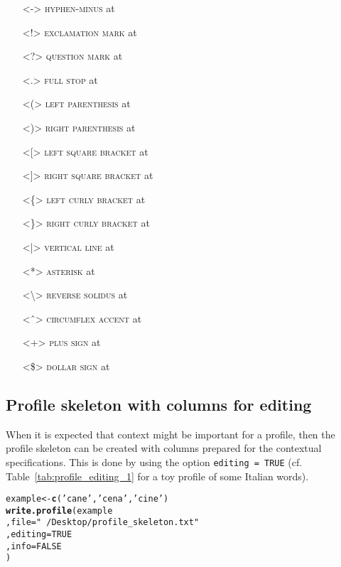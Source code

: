 \documentclass[output=inprep,
		biblatex
		]{LSP/langsci}\usepackage[]{graphicx}\usepackage[]{color}
\makeatletter
\newcommand{\hlnum}[1]{\textcolor[rgb]{0.686,0.059,0.569}{#1}}%
\newcommand{\hlstr}[1]{\textcolor[rgb]{0.192,0.494,0.8}{#1}}%
\newcommand{\hlstd}[1]{\textcolor[rgb]{0.345,0.345,0.345}{#1}}%
\newcommand{\hlkwb}[1]{\textcolor[rgb]{0.69,0.353,0.396}{#1}}%
\newcommand{\hlkwc}[1]{\textcolor[rgb]{0.333,0.667,0.333}{#1}}%
\newcommand{\hlkwd}[1]{\textcolor[rgb]{0.737,0.353,0.396}{\textbf{#1}}}%
\newenvironment{kframe}{%
 \def\at@end@of@kframe{}%
 \ifinner\ifhmode%
  \def\at@end@of@kframe{\end{minipage}}%
  \begin{minipage}{\columnwidth}%
 \fi\fi%
 \def\FrameCommand##1{\hskip\@totalleftmargin \hskip-\fboxsep
 \colorbox{shadecolor}{##1}\hskip-\fboxsep
     \hskip-\linewidth \hskip-\@totalleftmargin \hskip\columnwidth}%
 \MakeFramed {\advance\hsize-\width
   \@totalleftmargin\z@ \linewidth\hsize
   \@setminipage}}%
 {\par\unskip\endMakeFramed%
 \at@end@of@kframe}
\newenvironment{knitrout}{}{} %
\makeatother
\begin{document}
\begin{itemize}
  
  \item[] <-> \textsc{hyphen-minus} at 
  \item[] <!> \textsc{exclamation mark} at 
  \item[] <?> \textsc{question mark} at 
  \item[] <.> \textsc{full stop} at 
  \item[] <(> \textsc{left parenthesis} at 
  \item[] <)> \textsc{right parenthesis} at 
  \item[] <[> \textsc{left square bracket} at 
  \item[] <]> \textsc{right square bracket} at 
  \item[] <\{> \textsc{left curly bracket} at 
  \item[] <\}> \textsc{right curly bracket} at 
  \item[] <|> \textsc{vertical line} at 
  \item[] <*> \textsc{asterisk} at 
  \item[] <\backslash> \textsc{reverse solidus} at 
  \item[] <ˆ> \textsc{circumflex accent} at 
  \item[] <+> \textsc{plus sign} at 
  \item[] <\$> \textsc{dollar sign} at 
  
\end{itemize}

\subsection*{Profile skeleton with columns for editing}
\label{profile-editing}

When it is expected that context might be important for a profile, then the
profile skeleton can be created with columns prepared for the contextual
specifications. This is done by using the option \texttt{editing = TRUE} (cf.
Table~\ref{tab:profile_editing_1} for a toy profile of some Italian words).

\begin{knitrout}\footnotesize
{}\color{fgcolor}\begin{kframe}
\begin{alltt}
\hlstd{example} \hlkwb{<-} \hlkwd{c}\hlstd{(}\hlstr{'cane'}\hlstd{,} \hlstr{'cena'}\hlstd{,} \hlstr{'cine'}\hlstd{)}
\hlkwd{write.profile}\hlstd{(example}
              \hlstd{,} \hlkwc{file} \hlstd{=} \hlstr{"~/Desktop/profile_skeleton.txt"}
              \hlstd{,} \hlkwc{editing} \hlstd{=} \hlnum{TRUE}
              \hlstd{,} \hlkwc{info} \hlstd{=} \hlnum{FALSE}
              \hlstd{)}
\end{alltt}
\end{kframe}
\end{knitrout}
\end{document}
